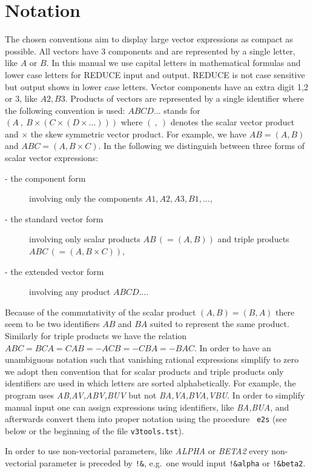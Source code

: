 \documentclass[12pt]{article}
\begin{document}
\section{Notation}
The chosen conventions aim to display large vector expressions as
compact as possible. All vectors have 3 components and are
represented by a single letter, like $A$ or $B$. In this manual we use
capital letters in mathematical formulas and lower case letters for REDUCE
input and output. REDUCE is not case sensitive but output shows in lower 
case letters. Vector components have an extra digit 1,2 or 3, like $A2,
B3$. Products of vectors are represented by a single identifier where
the following convention is used: $ABCD...$ stands for $(A\ ,\ B
\times (C \times (D \times ...)))$ where $(\ ,\ )$ denotes the
scalar vector product and $\times$ the skew symmetric vector
product. For example, we have $AB = (A,B)$ and $ABC=(A,B\times C)$.
In the following we distinguish between three forms of scalar vector
expressions:
\begin{description}
\item[- the component form] involving only the components 
        $A1,A2,A3,B1,...$,
\item[- the standard vector form] involving only scalar products
        $AB\,(=(A,B))$ and triple products $ABC\,(=(A,B \times C))$,
\item[- the extended vector form] involving any product $ABCD...$.
\end{description}
Because of the commutativity of the scalar product $(A,B)=(B,A)$ there
seem to be two identifiers $AB$ and $BA$ suited to represent the same
product. Similarly for triple products we have the relation
$ABC=BCA=CAB=-ACB=-CBA=-BAC$. In order to have an unambiguous
notation such that vanishing rational expressions simplify to zero we
adopt then convention that for scalar products and triple products
only identifiers are used in which letters are sorted
alphabetically. For example, the program uses {\it AB,AV,ABV,BUV} but
not {\it BA,VA,BVA,VBU}. In order to simplify manual input one can
assign expressions using identifiers, like {\it BA,BUA}, and afterwards
convert them into proper notation using the procedure {\tt
e2s} (see below or the beginning of the file {\tt v3tools.tst}).

In order to use non-vectorial parameters, like {\it ALPHA} or {\it BETA2}
every non-vectorial parameter is preceded by {\tt !\&}, e.g.\
one would input {\tt !\&alpha} or {\tt !\&beta2}.
\end{document}
